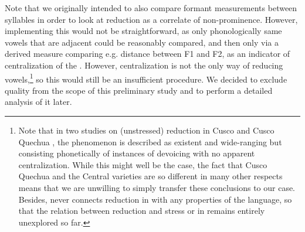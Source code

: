 \documentclass[output=paper]{LSP/langsci}
\begin{document}
Note that we originally intended to also compare formant measurements between syllables in order to look at  reduction as a correlate of non-pro\-mi\-nence. However, implementing this would not be straightforward, as only phonologically same vowels that are adjacent could be reasonably compared, and then only via a derived measure comparing e.g. distance between F1 and F2, as an indicator of centralization of the . However, centralization is not the only way of reducing vowels,\footnote{Note that in two studies on (unstressed)  reduction in Cusco  \citep{Delforge2008} and Cusco Quechua \citep{Delforge2011}, the phenomenon is described as existent and wide-ranging but consisting phonetically of instances of  devoicing with no apparent centralization. While this might well be the case, the fact that Cusco Quechua and the Central  varieties are so different in many other respects means that we are unwilling to simply transfer these conclusions to our case. Besides, \citet{Delforge2011} never connects  reduction in  with any  properties of the language, so that the relation between  reduction and stress or  in  remains entirely unexplored so far.} so this would still be an insufficient procedure. We decided to exclude  quality from the scope of this preliminary study and to perform a detailed analysis of it later. 
\end{document}
